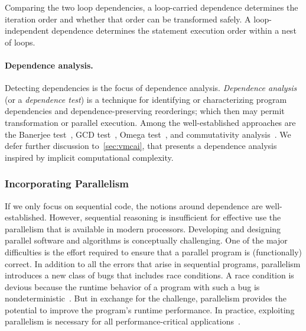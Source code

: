 Comparing the two loop dependencies, a loop-carried dependence determines the iteration order and whether that order can be transformed safely.
A loop-independent dependence determines the statement execution order within a nest of loops.

\paragraph*{Dependence analysis.}
Detecting dependencies is the focus of dependence analysis.
\emph{Dependence analysis} (or a \emph{dependence test})
is a technique for identifying or characterizing program dependencies and dependence-preserving reorderings;
which then may permit transformation or parallel execution.
Among the well-established approaches are
the Banerjee test~\cite{banerjee1997},
GCD test~\cite{zima199},
Omega test~\cite{pugh1991},
and commutativity analysis~\cite{rinard1996}.
We defer further discussion to~\autoref{sec:vmcai}, that presents a dependence analysis inspired by implicit computational complexity.

\subsubsection{Incorporating Parallelism}

If we only focus on sequential code, the notions around dependence are well-established.
However, sequential reasoning is insufficient for effective use the parallelism that is available in modern processors.
Developing and designing parallel software and algorithms is conceptually challenging.
One of the major difficulties is the effort required to ensure that a parallel program is (functionally) correct.
In addition to all the errors that arise in sequential programs, parallelism introduces a new class of bugs that includes race conditions.
A race condition is devious because the runtime behavior of a program with such a bug is nondeterministic~\cite[p. 32]{chapman2007}.
But in exchange for the challenge, parallelism provides the potential to improve the program's runtime performance.
In practice, exploiting parallelism is necessary for all performance-critical applications~\cite{suomela2022}.

